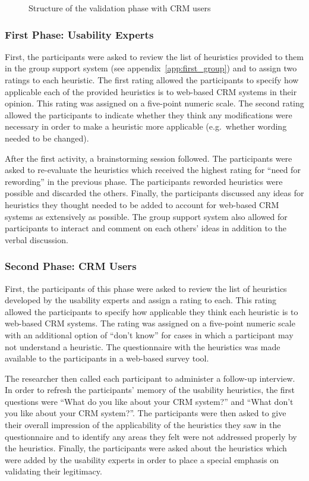 \begin{figure}[htbp]
	\centering
	
	\caption{Structure of the validation phase with CRM users}
	\label{img:session_structure_users}
\end{figure}

\subsubsection{First Phase: Usability Experts}
First, the participants were asked to review the list of heuristics provided to them in the group support system (see appendix~\ref{app:first_group}) and to assign two ratings to each heuristic. The first rating allowed the participants to specify how applicable each of the provided heuristics is to web-based CRM systems in their opinion. This rating was assigned on a five-point numeric scale. The second rating allowed the participants to indicate whether they think any modifications were necessary in order to make a heuristic more applicable (e.g.\ whether wording needed to be changed).

After the first activity, a brainstorming session followed. The participants were asked to re-evaluate the heuristics which received the highest rating for ``need for rewording'' in the previous phase. The participants reworded heuristics were possible and discarded the others. Finally, the participants discussed any ideas for heuristics they thought needed to be added to account for web-based CRM systems as extensively as possible. The group support system also allowed for participants to interact and comment on each others' ideas in addition to the verbal discussion.

\subsubsection{Second Phase: CRM Users}
First, the participants of this phase were asked to review the list of heuristics developed by the usability experts and assign a rating to each. This rating allowed the participants to specify how applicable they think each heuristic is to web-based CRM systems. The rating was assigned on a five-point numeric scale with an additional option of ``don't know'' for cases in which a participant may not understand a heuristic. The questionnaire with the heuristics was made available to the participants in a web-based survey tool.

The researcher then called each participant to administer a follow-up interview. In order to refresh the participants' memory of the usability heuristics, the first questions were ``What do you like about your CRM system?'' and ``What don't you like about your CRM system?''. The participants were then asked to give their overall impression of the applicability of the heuristics they saw in the questionnaire and to identify any areas they felt were not addressed properly by the heuristics. Finally, the participants were asked about the heuristics which were added by the usability experts in order to place a special emphasis on validating their legitimacy.

